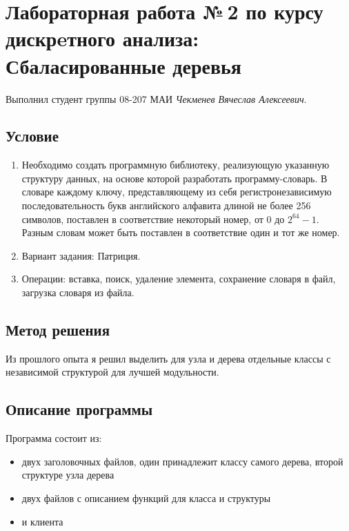 \documentclass[12pt]{article}
\begin{document}
\section*{Лабораторная работа №\,2 по курсу дискрeтного анализа: Сбаласированные деревья}

Выполнил студент группы 08-207 МАИ \textit{Чекменев Вячеслав Алексеевич}.

\subsection*{Условие}

\begin{enumerate}
\item Необходимо создать программную библиотеку, реализующую указанную структуру данных, 
на основе которой разработать программу-словарь. В словаре каждому ключу, представляющему 
из себя регистронезависимую последовательность букв английского алфавита длиной не более 
256 символов, поставлен в соответствие некоторый номер, от $0$ до $2^{64} - 1$. Разным словам 
может быть поставлен в соответствие один и тот же номер.
\item Вариант задания: Патриция.
\item Операции: вставка, поиск, удаление элемента, сохранение словаря в файл, загрузка словаря 
из файла.
\end{enumerate}

\subsection*{Метод решения}

Из прошлого опыта я решил выделить для узла и дерева отдельные классы с независимой структурой для лучшей модульности.

\subsection*{Описание программы}

Программа состоит из:
\begin{itemize}
    \item двух заголовочных файлов, один принадлежит классу самого дерева, второй структуре узла дерева 
    \item двух файлов с описанием функций для класса и структуры
    \item и клиента
\end{itemize}
\end{document}
